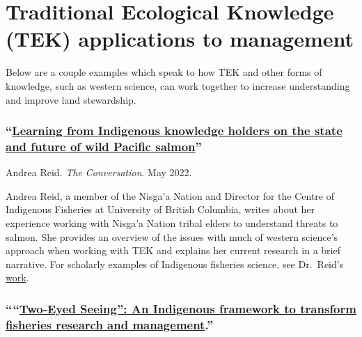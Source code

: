 \documentclass[
]{book}
\begin{document}
\hypertarget{traditional-ecological-knowledge-tek-applications-to-management}{%
\section{Traditional Ecological Knowledge (TEK) applications to management}\label{traditional-ecological-knowledge-tek-applications-to-management}}

Below are a couple examples which speak to how TEK and other forms of knowledge, such as western science, can work together to increase understanding and improve land stewardship.

\hypertarget{learning-from-indigenous-knowledge-holders-on-the-state-and-future-of-wild-pacific-salmon}{%
\subsubsection*{\texorpdfstring{``\href{https://theconversation.com/learning-from-indigenous-knowledge-holders-on-the-state-and-future-of-wild-pacific-salmon-182411}{Learning from Indigenous knowledge holders on the state and future of wild Pacific salmon}''}{``Learning from Indigenous knowledge holders on the state and future of wild Pacific salmon''}}\label{learning-from-indigenous-knowledge-holders-on-the-state-and-future-of-wild-pacific-salmon}}

Andrea Reid. \emph{The Conversation}. May 2022.

Andrea Reid, a member of the Nisga'a Nation and Director for the Centre of Indigenous Fisheries at University of British Columbia, writes about her experience working with Nisga'a Nation tribal elders to understand threats to salmon. She provides an overview of the issues with much of western science's approach when working with TEK and explains her current research in a brief narrative. For scholarly examples of Indigenous fisheries science, see Dr.~Reid's \href{https://scholar.google.com/citations?hl=en\&user=WWdYxJgAAAAJ}{work}.

\hypertarget{twoeyed-seeing-an-indigenous-framework-to-transform-fisheries-research-and-management.}{%
\subsubsection*{\texorpdfstring{````\href{https://onlinelibrary.wiley.com/doi/full/10.1111/faf.12516}{Two‐Eyed Seeing'': An Indigenous framework to transform fisheries research and management}.''}{``\,``Two‐Eyed Seeing'': An Indigenous framework to transform fisheries research and management.''}}\label{twoeyed-seeing-an-indigenous-framework-to-transform-fisheries-research-and-management.}}
\end{document}
